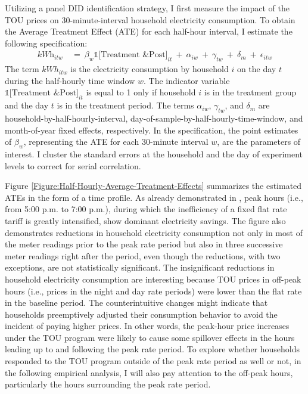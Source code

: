 Utilizing a panel DID identification strategy, I first measure the impact of the TOU prices on 30-minute-interval household electricity consumption. To obtain the Average Treatment Effect (ATE) for each half-hour interval, I estimate the following specification:
\begin{equation}
\begin{split}
    \textit{kWh}_{itw} \ 
    & = \ \beta_{w} \mathbb{1}\big[ \text{Treatment \& Post} \big]_{it} \ + \ \alpha_{iw} \ + \ \gamma_{tw} \ + \ \delta_{m} \ + \ \epsilon_{itw}
\end{split}
\label{Eq:Model-Specification_Half-Hourly-Average-Treatment-Effects}
\end{equation}
The term $kWh_{itw}$ is the electricity consumption by household $i$ on the day $t$ during the half-hourly time window $w$. The indicator variable $\mathbb{1}\big[ \text{Treatment \& Post} \big]_{it}$ is equal to 1 only if household $i$ is in the treatment group and the day $t$ is in the treatment period. The terms $\alpha_{iw}$, $\gamma_{tw}$, and $\delta_{m}$ are household-by-half-hourly-interval, day-of-sample-by-half-hourly-time-window, and month-of-year fixed effects, respectively. In the specification, the point estimates of $\beta_{w}$, representing the ATE for each 30-minute interval $w$, are the parameters of interest. I cluster the standard errors at the household and the day of experiment levels to correct for serial correlation.

Figure \ref{Figure:Half-Hourly-Average-Treatment-Effects} summarizes the estimated ATEs in the form of a time profile. As already demonstrated in \cite{Peaking-Interest:How-Awareness-Drives-the-Effectiveness-of-Time-of-Use-Electricity-Pricing_Prest_2020}, peak hours (i.e., from 5:00 p.m. to 7:00 p.m.), during which the inefficiency of a fixed flat rate tariff is greatly intensified, show dominant electricity savings. The figure also demonstrates reductions in household electricity consumption not only in most of the meter readings prior to the peak rate period but also in three successive meter readings right after the period, even though the reductions, with two exceptions, are not statistically significant. The insignificant reductions in household electricity consumption are interesting because TOU prices in off-peak hours (i.e., prices in the night and day rate periods) were lower than the flat rate in the baseline period. The counterintuitive changes might indicate that households preemptively adjusted their consumption behavior to avoid the incident of paying higher prices. In other words, the peak-hour price increases under the TOU program were likely to cause some spillover effects in the hours leading up to and following the peak rate period. To explore whether households responded to the TOU program outside of the peak rate period as well or not, in the following empirical analysis, I will also pay attention to the off-peak hours, particularly the hours surrounding the peak rate period.
